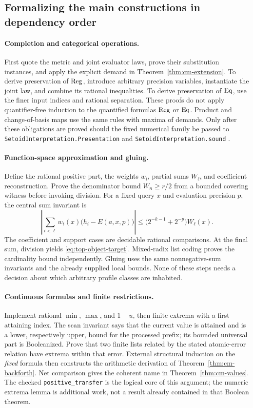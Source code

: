 \subsection{Formalizing the main constructions in dependency order}

\paragraph{Completion and categorical operations.}
First quote the metric and joint evaluator laws, prove their substitution
instances, and apply the explicit demand in
Theorem~\ref{thm:cm-extension}. To derive preservation of \(\operatorname{Reg}\), introduce
arbitrary precision variables, instantiate the joint law, and combine its
rational inequalities. To derive preservation of \(\operatorname{Eq}\), use the finer
input indices and rational separation. These proofs do not apply
quantifier-free induction to the quantified formulas \(\operatorname{Reg}\) or \(\operatorname{Eq}\).
Product and change-of-basis maps use the same rules with maxima of demands.
Only after these obligations are proved should the fixed numerical family
be passed to \texttt{SetoidInterpretation.Presentation} and
\texttt{SetoidInterpretation.sound} \cite{repoSetoid}.

\paragraph{Function-space approximation and gluing.}
Define the rational positive part, the weights \(w_i\), partial sums
\(W_\ell\), and coefficient reconstruction. Prove the denominator bound
\(W_n\geq r/2\) from a bounded covering witness before invoking division.
For a fixed query \(x\) and evaluation precision \(p\), the central
sum invariant is
\[
 \left|\sum_{i<\ell}w_i(x)
            \bigl(h_i-E(a,x,p)\bigr)\right|
       \leq\bigl(2^{-k-1}+2^{-p}\bigr)W_\ell(x).
\]
The coefficient and support cases are decidable rational comparisons.
At the final sum, division yields \eqref{eq:top-object-target}.
Mixed-radix list coding proves the cardinality bound independently.
Gluing uses the same nonnegative-sum invariants and the already supplied
local bounds. None of these steps needs a decision about which arbitrary
profile classes are inhabited.

\paragraph{Continuous formulas and finite restrictions.}
Implement rational \(\min\), \(\max\), and \(1-u\), then finite extrema
with a first attaining index. The scan invariant says that the current
value is attained and is a lower, respectively upper, bound for the
processed prefix; its bounded universal part is Booleanized.
Prove that two finite lists related by the stated atomic-error relation
have extrema within that error. External structural induction on the
\emph{fixed} formula then constructs the arithmetic derivation of
Theorem~\ref{thm:cm-backforth}. Net comparison gives the coherent name in
Theorem~\ref{thm:cm-values}. The checked \texttt{positive\_transfer} is the
logical core of this argument; the numeric extrema lemma is additional
work, not a result already contained in that Boolean theorem.

